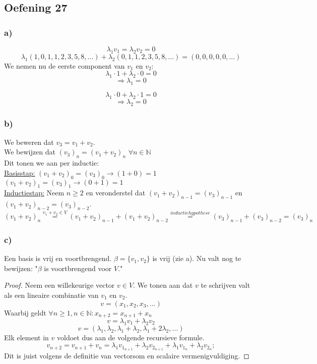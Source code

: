 \documentclass[lineaire_algebra_oplossingen.tex]{subfiles}
\begin{document}
\subsection{Oefening 27}
\subsubsection*{a)}
$$\lambda_1 v_1 = \lambda_2 v_2 = 0$$
$$\lambda_1(1,0,1,1,2,3,5,8,...) + \lambda_2(0,1,1,2,3,5,8,...)=(0,0,0,0,0,...)$$
We nemen nu de eerste component van $v_1$ en $v_2$:
$$\lambda_1 \cdot 1 + \lambda_2 \cdot 0 = 0$$
$$\Rightarrow \lambda_1 = 0$$

$$\lambda_1 \cdot 0 + \lambda_2 \cdot 1 = 0$$
$$\Rightarrow \lambda_2 = 0$$
\subsubsection*{b)}
We beweren dat $v_3 = v_1 + v_2$.\\
We bewijzen dat $(v_3)_n = (v_1 + v_2)_n$ \hspace{5pt} $\forall n \in \mathbb{N}$\\
Dit tonen we aan per inductie:\\
\underline{Basisstap:} $(v_1 + v_2)_0 = (v_3)_0 \rightarrow (1 + 0) = 1$\\
\hspace*{4.5em} $(v_1 + v_2)_1 = (v_3)_1 \rightarrow (0 + 1) = 1$\\
\underline{Inductiestap:} Neem $n \geq 2$ en veronderstel dat $(v_1 + v_2)_{n-1} = (v_3)_{n-1}$ en $(v_1 + v_2)_{n-2} = (v_3)_{n-2}$.\\
\[
(v_1 + v_2)_n \overset{v_1 + v_2 \in V}{=} (v_1 + v_2)_{n-1} + (v_1 + v_2)_{n-2} \overset{inductiehypothese}{=} (v_3)_{n-1} + (v_3)_{n-2} = (v_3)_n
\]
\subsubsection*{c)}
Een basis is vrij en voortbrengend. $\beta = \{v_1,v_2\}$ is vrij (zie a).
Nu valt nog te bewijzen: "$\beta$ is voortbrengend voor $V$."
\begin{proof}
Neem een willekeurige vector $v \in V$. We tonen aan dat $v$ te schrijven valt als een lineaire combinatie van $v_1$ en $v_2$.
\[
v=(x_1,x_2,x_3,...)
\]
Waarbij geldt $\forall n \ge 1, n \in \mathbb{N}: x_{n+2}=x_{n+1}+x_n$
\[
v = \lambda_1v_1 + \lambda_2v_2
\]
\[
v = (\lambda_1,\lambda_2,\lambda_1+\lambda_2,\lambda_1+2\lambda_2,...)
\]
Elk element in $v$ voldoet dus aan de volgende recursieve formule.
\[
v_{n+2} = v_{n+1}+v_n=\lambda_1v_{1_{n+1}}+\lambda_2v_{2_{n+1}} + \lambda_1v_{1_{n}}+\lambda_2v_{2_{n}};
\]
Dit is juist volgens de definitie van vectorsom en scalaire vermenigvuldiging.
\end{proof}
\end{document}
